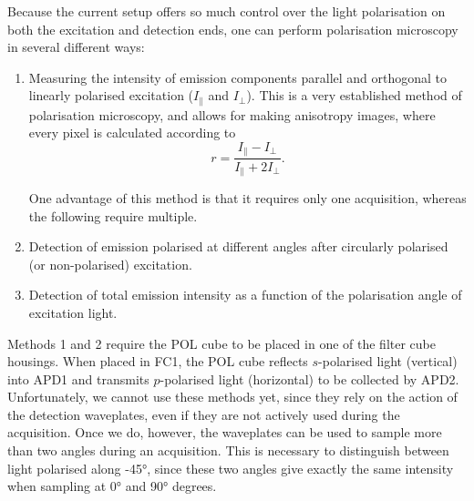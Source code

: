Because the current setup offers so much control over the light polarisation on both the excitation and detection ends, one can perform polarisation microscopy in several different ways:
\begin{enumerate}
	\item Measuring the intensity of emission components parallel and orthogonal to linearly polarised excitation ($ I_\parallel $ and $ I_\perp $). This is a very established method of polarisation microscopy, and allows for making anisotropy images, where every pixel is calculated according to
	\begin{equation}
		r=\frac{I_\parallel - I_\perp}{I_\parallel + 2I_\perp}.
	\end{equation}
	
	One advantage of this method is that it requires only one acquisition, whereas the following require multiple.
	
	\item Detection of emission polarised at different angles after circularly polarised (or non-polarised) excitation.
	
	\item Detection of total emission intensity as a function of the polarisation angle of excitation light.
\end{enumerate}

Methods 1 and 2 require the POL cube to be placed in one of the filter cube housings. When placed in FC1, the POL cube reflects $ s $-polarised light (vertical) into APD1 and transmits $ p $-polarised light (horizontal) to be collected by APD2. Unfortunately, we cannot use these methods yet, since they rely on the action of the detection waveplates, even if they are not actively used during the acquisition. Once we do, however, the waveplates can be used to sample more than two angles during an acquisition. This is necessary to distinguish between light polarised along \ang{+-45}, since these two angles give exactly the same intensity when sampling at \ang{0} and \ang{90} degrees.

